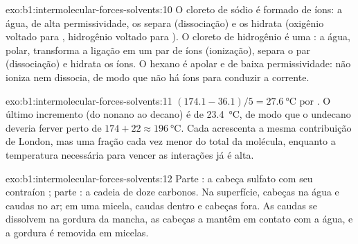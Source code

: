 \begin{solution}{exo:b1:intermolecular-forces-solvents:10}
O cloreto de sódio é formado de íons: a água, de alta permissividade,
os separa (dissociação) e os hidrata (oxigênio voltado para ,
hidrogênio voltado para ). O cloreto de hidrogênio é uma : a água, polar, transforma a ligação  em um par de íons
 (ionização), separa o par (dissociação) e hidrata os íons.
O hexano é apolar e de baixa permissividade: não ioniza nem dissocia, de
modo que não há íons para conduzir a corrente.
\end{solution}

\begin{solution}{exo:b1:intermolecular-forces-solvents:11}
$(174.1 - 36.1)/5 = \qty{27.6}{\celsius}$ por . O último
incremento (do nonano ao decano) é de \qty{23.4}{\celsius}, de modo que o
undecano deveria ferver perto de $174 + 22 \approx \qty{196}{\celsius}$.
Cada  acrescenta a mesma contribuição de London, mas uma fração
cada vez menor do total da molécula, enquanto a temperatura necessária
para vencer as interações já é alta.
\end{solution}

\begin{solution}{exo:b1:intermolecular-forces-solvents:12}
Parte : a cabeça sulfato  com seu contraíon ;
parte : a cadeia de doze carbonos. Na superfície, cabeças na
água e caudas no ar; em uma micela, caudas dentro e cabeças fora. As
caudas se dissolvem na gordura da mancha, as cabeças a mantêm em contato
com a água, e a gordura é removida em micelas.
\end{solution}

